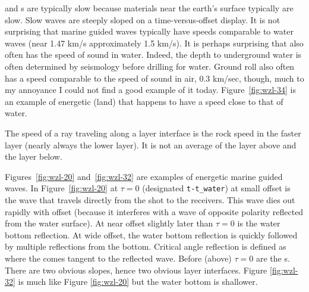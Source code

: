 \par
{}
and s are typically slow
because materials near the earth's surface typically are slow.
Slow waves are steeply sloped on a time-versus-offset display.
It is not surprising that marine guided waves
typically have speeds comparable to water waves
(near 1.47 km/s approximately 1.5 km/s).
It is perhaps surprising that 
also often has the speed of sound in water.
Indeed, the depth to underground water is often determined
by seismology before drilling for water.
Ground roll also often has a speed
comparable to the speed of sound in air,
0.3 km/sec, though, much to my annoyance I could not find
a good example of it today.
Figure~\ref{fig:wzl-34} is an example of energetic  (land)
that happens to have a speed close to that of water.

\par
The speed of a ray traveling along a layer interface
is the rock speed in the faster layer (nearly always the lower layer).
It is not an average of the layer above and the layer below.


\par
Figures~\ref{fig:wzl-20} and~\ref{fig:wzl-32}
are examples of energetic marine guided waves.
In Figure~\ref{fig:wzl-20}
at $\tau=0$ (designated {\tt t-t\_water}) at small offset
is the wave that travels directly from the shot to the receivers.
This wave dies out rapidly with offset
(because it interferes with a wave of opposite polarity
reflected from the water surface).
At near offset slightly later than $\tau=0$ is the water bottom reflection.
At wide offset, the water bottom reflection is quickly followed 
by multiple reflections from the bottom.
Critical angle reflection is defined as where the 
comes tangent to the reflected wave.
Before (above) $\tau=0$ are the s.
There are two obvious slopes,
hence two obvious layer interfaces.
Figure \ref{fig:wzl-32} is much like Figure \ref{fig:wzl-20}
but the water bottom is shallower.

